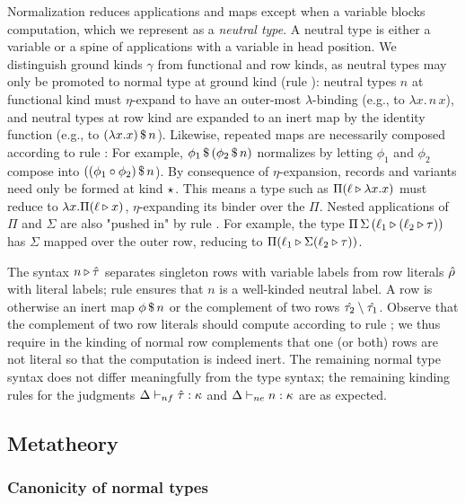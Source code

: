 \documentclass[authoryear, acmsmall, screen, review, nonacm]{acmart} %
\begin{document}
Normalization reduces applications and maps except when a variable blocks computation, which we represent as a \emph{neutral type}. A neutral type is either a variable or a spine of applications with a variable in head position. We distinguish ground kinds $\gamma$ from functional and row kinds, as neutral types may only be promoted to normal type at ground kind (rule ): neutral types $n$ at functional kind must $\eta$-expand to have an outer-most $\lambda$-binding (e.g., to $\lambda x. \, n\, x$), and neutral types at row kind are expanded to an inert map by the identity function (e.g., to ${(\lambda x. x)} \, \mathdollar \, n$). Likewise, repeated maps are necessarily composed according to rule : For example, ${\phi_{1}} \, \mathdollar \, ({\phi_{2}} \, \mathdollar \, n)$ normalizes by letting $\phi_{1}$ and $\phi_{2}$ compose into $({(\phi_{1} \circ \phi_{2})} \, \mathdollar \, n$). By consequence of $\eta$-expansion, records and variants need only be formed at kind $\star_{}$. This means a type such as $\Pi (\ell \triangleright \lambda x. x)$ must reduce to $\lambda x. \Pi (\ell \triangleright x)$, $\eta$-expanding its binder over the $\Pi$. Nested applications of $\Pi$ and $\Sigma$ are also "pushed in" by rule \erule{$\Xi$}. For example, the type $\Pi \, \Sigma \, (\ell_1 \triangleright (\ell_2 \triangleright \tau))$ has $\Sigma$ mapped over the outer row, reducing to $\Pi (\ell_1 \triangleright \Sigma (\ell_2 \triangleright \tau))$.

The syntax $n \triangleright \hat{\tau}$ separates singleton rows with variable labels from row literals $\hat{\rho}$ with literal labels; rule \kruleNF{$\triangleright$} ensures that $n$ is a well-kinded neutral label.  A row is otherwise an inert map ${\phi} \, \mathdollar \, n$ or the complement of two rows $\hat{\tau_2} \setminus \hat{\tau_1}$. Observe that the complement of two row literals should compute according to rule \erule{$\Compl$}; we thus require in the kinding of normal row complements \kruleNF{$\Compl$} that one (or both) rows are not literal so that the computation is indeed inert. The remaining normal type syntax does not differ meaningfully from the type syntax; the remaining kinding rules for the judgments $\Delta \vdash_{nf} \hat{\tau} : \kappa$ and $\Delta \vdash_{ne} n : \kappa$ are as expected.
\subsection{Metatheory}
\label{sec:metatheory-summary}

\subsubsection{Canonicity of normal types}
\end{document}
